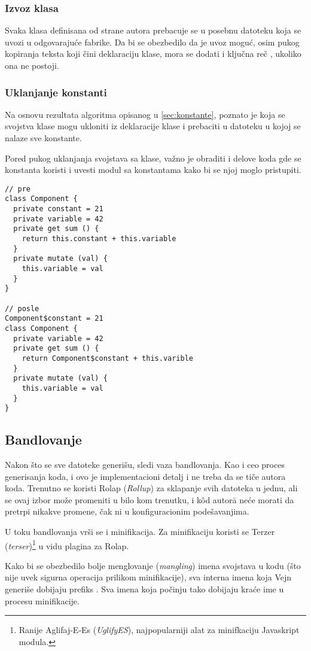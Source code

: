 \subsubsection{Izvoz klasa}

Svaka klasa definisana od strane autora prebacuje se u posebnu datoteku koja se uvozi u odgovarajuće fabrike.
Da bi se obezbedilo da je uvoz moguć, osim pukog kopiranja teksta koji čini deklaraciju klase, mora se dodati i ključna reč , ukoliko ona ne postoji.

\subsubsection{Uklanjanje konstanti}

Na osnovu rezultata algoritma opisanog u \cref{sec:konstante}, poznato je koja se svojstva klase mogu ukloniti iz deklaracije klase i prebaciti u datoteku u kojoj se nalaze sve konstante.

Pored pukog uklanjanja svojstava sa klase, važno je obraditi i delove koda gde se konstanta koristi i uvesti modul sa konstantama kako bi se njoj moglo pristupiti.

\begin{lstlisting}
// pre 
class Component {
  private constant = 21
  private variable = 42
  private get sum () {
    return this.constant + this.variable
  }
  private mutate (val) {
    this.variable = val
  }
}

// posle
Component$constant = 21
class Component {
  private variable = 42
  private get sum () {
    return Component$constant + this.varible
  }
  private mutate (val) {
    this.variable = val
  }
}
\end{lstlisting}

\subsection{Bandlovanje}\label{subsec:bandlovanje}

Nakon što se sve datoteke generišu, sledi vaza bandlovanja.
Kao i ceo proces generisanja koda, i ovo je implementacioni detalj i ne treba da se tiče autora koda.
Trenutno se koristi Rolap (\textsl{Rollup}) za sklapanje svih datoteka u jednu, ali se ovaj izbor može promeniti u bilo kom trenutku, i k\^od autor\=a neće morati da pretrpi nikakve promene, čak ni u konfiguracionim podešavanjima.

U toku bandlovanja vrši se i minifikacija.
Za minifikaciju koristi se Terzer (\textsl{terser})\footnote{Ranije Aglifaj-E-Es (\textsl{UglifyES}), najpopularniji alat za minifkaciju Javaskript modula.} u vidu plagina za Rolap.

Kako bi se obezbedilo bolje menglovanje (\textsl{mangling}) imena svojstava u kodu (što nije uvek sigurna operacija prilikom minifikacije), sva interna imena koja Vejn generiše dobijaju prefiks .
Sva imena koja počinju tako dobijaju kraće ime u procesu minifikacije.

